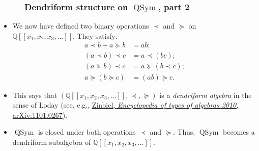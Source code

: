 \documentclass{beamer}
\newcommand{\red}{\color{red}}
\newcommand{\QQ}{{\mathbb Q}}
\newcommand{\QSym}{\operatorname{QSym}}
\newcommand{\Powser}{\QQ\left[\left[x_1,x_2,x_3,\ldots\right]\right]}
\newcommand{\fti}[1]{\frametitle{\ \ \ \ \ #1}}
\theoremstyle{plain}
\begin{document}
\begin{frame}
\fti{Dendriform structure on $\QSym$, part 2}

\begin{itemize}

\item We now have defined two binary operations $\left.\prec\right.$
and $\left.\succeq\right.$ on $\Powser$. They satisfy:
\begin{align*}
a\left.  \prec\right.  b+a \left.  \succeq\right.b  &  =ab;\\
\left(  a\left.  \prec\right.  b\right)  \left.  \prec\right.  c  &  =a\left.
\prec\right.  \left(  bc\right)  ;\\
\left(  a \left.  \succeq\right.  b\right)  \left.  \prec\right.  c
&  =a \left.  \succeq\right. \left(  b\left.  \prec\right.
c\right)  ;\\
a \left.  \succeq\right.  \left(  b \left.  \succeq\right.
c\right)   &  =\left(  ab\right)  \left.  \succeq\right.  c.
\end{align*}

\pause

\item This says that $\left(\Powser, \left.\prec\right., \left.\succeq\right.\right)$
is a \textit{dendriform algebra} in the sense of Loday
(see, e.g., {\red \href{http://arxiv.org/abs/1101.0267}{Zinbiel,
\textit{Encyclopedia of types of algebras 2010},
arXiv:1101.0267}}).

\pause

\item $\QSym$ is closed under both operations $\prec$ and $\succeq$.
Thus, $\QSym$ becomes a dendriform subalgebra of $\Powser$.

\end{itemize}

\vspace{9cm}

\end{frame}
\end{document}
